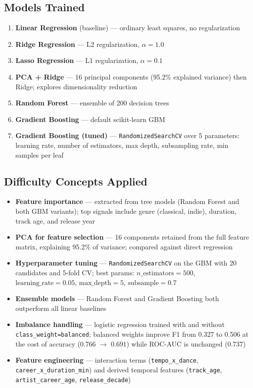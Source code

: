 \documentclass[11pt, letterpaper]{article}
\begin{document}
\subsection{Models Trained}

\begin{enumerate}[noitemsep]
    \item \textbf{Linear Regression} (baseline) — ordinary least squares, no regularization
    \item \textbf{Ridge Regression} — L2 regularization, $\alpha = 1.0$
    \item \textbf{Lasso Regression} — L1 regularization, $\alpha = 0.1$
    \item \textbf{PCA + Ridge} — 16 principal components (95.2\% explained variance) then Ridge; explores dimensionality reduction
    \item \textbf{Random Forest} — ensemble of 200 decision trees
    \item \textbf{Gradient Boosting} — default scikit-learn GBM
    \item \textbf{Gradient Boosting (tuned)} — \texttt{RandomizedSearchCV} over 5 parameters: learning rate, number of estimators, max depth, subsampling rate, min samples per leaf
\end{enumerate}

\subsection{Difficulty Concepts Applied}

\begin{itemize}[noitemsep]
    \item \textbf{Feature importance} — extracted from tree models (Random Forest and both GBM variants); top signals include genre (classical, indie), duration, track age, and release year
    \item \textbf{PCA for feature selection} — 16 components retained from the full feature matrix, explaining 95.2\% of variance; compared against direct regression
    \item \textbf{Hyperparameter tuning} — \texttt{RandomizedSearchCV} on the GBM with 20 candidates and 5-fold CV; best params: $n\_\text{estimators}=500$, $\text{learning\_rate}=0.05$, $\text{max\_depth}=5$, $\text{subsample}=0.7$
    \item \textbf{Ensemble models} — Random Forest and Gradient Boosting both outperform all linear baselines
    \item \textbf{Imbalance handling} — logistic regression trained with and without \texttt{class\_weight=\textquotesingle{}balanced\textquotesingle{}}; balanced weights improve F1 from 0.327 to 0.506 at the cost of accuracy (0.766 $\to$ 0.691) while ROC-AUC is unchanged (0.737)
    \item \textbf{Feature engineering} — interaction terms (\texttt{tempo\_x\_dance}, \texttt{career\_x\_duration\_min}) and derived temporal features (\texttt{track\_age}, \texttt{artist\_career\_age}, \texttt{release\_decade})
\end{itemize}
\end{document}
